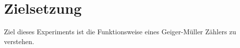 \section{Zielsetzung}
\label{sec:Zielsetzung}


Ziel dieses Experiments ist die Funktionsweise eines Geiger-Müller Zählers zu verstehen.